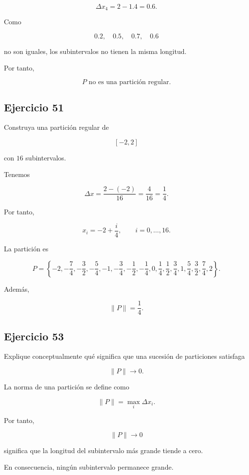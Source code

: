 \documentclass[12pt]{article}
\begin{document}
\[
\Delta x_4=2-1.4=0.6.
\]

Como

\[
0.2,\quad0.5,\quad0.7,\quad0.6
\]

no son iguales, los subintervalos no tienen la misma longitud.

Por tanto,

\[
\boxed{
P\text{ no es una partición regular}
}.
\]

\subsection*{Ejercicio 51}

Construya una partición regular de

\[
[-2,2]
\]

con \(16\) subintervalos.

Tenemos

\[
\Delta x
=
\frac{2-(-2)}{16}
=
\frac4{16}
=
\frac14.
\]

Por tanto,

\[
x_i
=
-2+\frac{i}{4},
\qquad
i=0,\ldots,16.
\]

La partición es

\[
P=
\left\{
-2,
-\frac74,
-\frac32,
-\frac54,
-1,
-\frac34,
-\frac12,
-\frac14,
0,
\frac14,
\frac12,
\frac34,
1,
\frac54,
\frac32,
\frac74,
2
\right\}.
\]

Además,

\[
\boxed{
\|P\|=\frac14
}.
\]

\subsection*{Ejercicio 53}

Explique conceptualmente qué significa que una sucesión de particiones
satisfaga

\[
\|P\|\longrightarrow0.
\]

La norma de una partición se define como

\[
\|P\|
=
\max_i\Delta x_i.
\]

Por tanto,

\[
\|P\|\to0
\]

significa que la longitud del subintervalo más grande tiende a cero.

En consecuencia, ningún subintervalo permanece grande.
\end{document}
